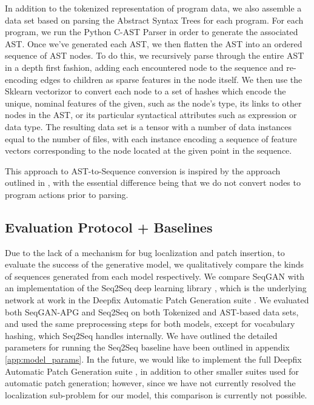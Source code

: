 \documentclass[sigconf]{acmart}
\begin{document}
In addition to the tokenized representation of program data, we also assemble a data set based on parsing the Abstract Syntax Trees for each program. For each program, we run the Python C-AST Parser \cite{bendersky2017pycparser} in order to generate the associated AST. Once we've generated each AST, we then flatten the AST into an ordered sequence of AST nodes. To do this, we recursively parse through the entire AST in a depth first fashion, adding each encountered node to the sequence and re-encoding edges to children as sparse features in the node itself. We then use the Sklearn vectorizor \cite{pedregosa2011scikit} to convert each node to a set of hashes which encode the unique, nominal features of the given, such as the node's type, its links to other nodes in the AST, or its particular syntactical attributes such as expression or data type. The resulting data set is a tensor with a number of data instances equal to the number of files, with each instance encoding a sequence of feature vectors corresponding to the node located at the given point in the sequence.

This approach to AST-to-Sequence conversion is inspired by the approach outlined in \cite{rabinovich2017ast}, with the essential difference being that we do not convert nodes to program actions prior to parsing. %

\subsection{Evaluation Protocol + Baselines}
\label{sec:evaluation}
Due to the lack of a mechanism for bug localization and patch insertion, to evaluate the success of the generative model, we qualitatively compare the kinds of sequences generated from each model respectively. We compare SeqGAN with an implementation of the Seq2Seq deep learning library \cite{luong2015seq2seq}, which is the underlying network at work in the Deepfix Automatic Patch Generation suite \cite{gupta2017deepfix}. We evaluated both SeqGAN-APG and Seq2Seq on both Tokenized and AST-based data sets, and used the same preprocessing steps for both models, except for vocabulary hashing, which Seq2Seq handles internally. We have outlined the detailed parameters for running the Seq2Seq baseline have been outlined in appendix \ref{app:model_params}. In the future, we would like to implement the full Deepfix Automatic Patch Generation suite \cite{gupta2017deepfix}, in addition to other smaller suites used for automatic patch generation; however, since we have not currently resolved the localization sub-problem for our model, this comparison is currently not possible.
\end{document}
